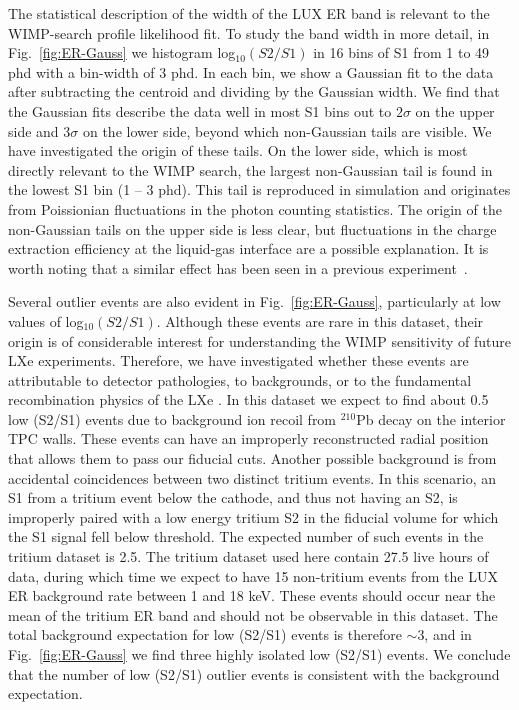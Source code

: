 The statistical description of the width of the LUX ER band is relevant to the WIMP-search profile likelihood fit. To study the band width in more detail, in Fig.~\ref{fig:ER-Gauss} we histogram log$_{10}(S2/S1)$ in 16 bins of S1 from 1 to 49 phd with a bin-width of 3 phd. In each bin, we show a Gaussian fit to the data after subtracting the centroid and dividing by the Gaussian width. We find that the Gaussian fits describe the data well  in most S1 bins out to $2\sigma$ on the upper side and $3\sigma$ on the lower side, beyond which non-Gaussian tails are visible.  We have investigated the origin of these tails. On the lower side, which is most directly relevant to the WIMP search, the largest non-Gaussian tail is found in the lowest S1 bin (1 -- 3 phd). This tail is reproduced in simulation and originates from Poissionian fluctuations in the photon counting statistics. The origin of the non-Gaussian tails on the upper side is less clear, but fluctuations in the charge extraction efficiency at the liquid-gas interface are a possible explanation. It is worth noting that a similar effect has been seen in a previous experiment~\cite{zep3}.

Several outlier events are also evident in Fig.~\ref{fig:ER-Gauss}, particularly at low values of log$_{10}(S2/S1)$. Although these events are rare in this dataset, their origin is of considerable interest for understanding the WIMP sensitivity of future LXe experiments.  Therefore, we have investigated whether these events are attributable to detector pathologies, to backgrounds, or to the fundamental recombination physics of the LXe . In this dataset we expect to find about 0.5 low (S2/S1) events due to background ion recoil from $^{210}$Pb decay on the interior TPC walls. These events can have an improperly reconstructed radial position that allows them to pass our fiducial cuts.  Another possible background is from accidental coincidences between two distinct tritium events. In this scenario, an S1 from a tritium event below the cathode, and thus not having an S2, is improperly paired with a low energy tritium S2 in the fiducial volume for which the S1 signal fell below threshold. The expected number of such events in the tritium dataset is 2.5. The tritium dataset used here contain 27.5 live hours of data, during which time we expect to have 15 non-tritium events from the LUX ER background rate between 1 and 18 keV. These events should occur near the mean of the tritium ER band and should not be observable in this dataset. The total background expectation for low (S2/S1) events is therefore $\sim$3, and in Fig.~\ref{fig:ER-Gauss} we find three highly isolated low (S2/S1) events. We conclude that the number of low (S2/S1) outlier events is consistent with the background expectation.

